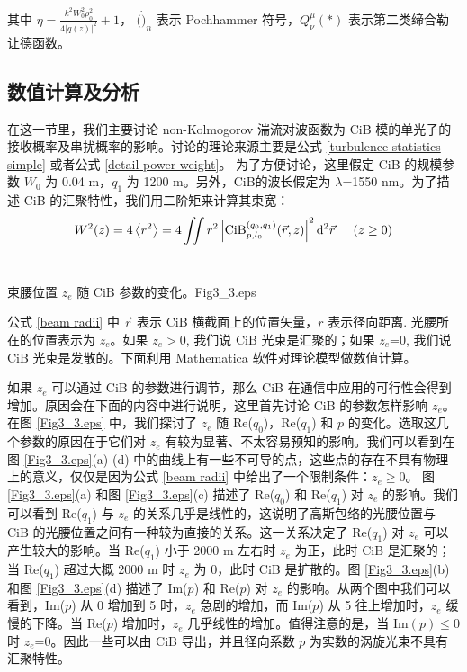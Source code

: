 \documentclass[master]{thesis-uestc}
\begin{document}
\noindent 其中 $\eta=\frac{k^2W_0^2\rho_0^2}{4|q(z)|^2}+1$， $(\dot)_n$ 表示 Pochhammer 符号，$Q_\nu^\mu(\ast)$ 表示第二类缔合勒让德函数。

\subsection{数值计算及分析}

在这一节里，我们主要讨论 non-Kolmogorov 湍流对波函数为 CiB 模的单光子的接收概率及串扰概率的影响。讨论的理论来源主要是公式 \eqref{turbulence statistics simple} 或者公式 \eqref{detail power weight}。 为了方便讨论，这里假定 CiB 的规模参数 $W_0$ 为 0.04 m，$q_1$ 为 1200 m。另外，CiB的波长假定为 $\lambda$=1550 nm。为了描述 CiB 的汇聚特性，我们用二阶矩来计算其束宽：
\begin{equation}\label{beam radii}
  W^2(z)=4\left<r^2\right>=4 \iint r^2\left|\mathrm{CiB}^{(q_0,q_1)}_{p,l_0}(\vec{r},z)\right|^2\mathrm{d}^2\vec{r}\hspace{0.5cm}(z \geq 0)
\end{equation}
\\
\begin{pics}[H]{束腰位置 $z_e$ 随 CiB 参数的变化。}{Fig3_3.eps}
\end{pics}

\noindent 公式 \eqref{beam radii} 中 $\vec{r}$ 表示 CiB 横截面上的位置矢量，$r$ 表示径向距离. 光腰所在的位置表示为 $z_e$。如果 $z_e>0$, 我们说 CiB 光束是汇聚的；如果 $z_e$=0, 我们说 CiB 光束是发散的。下面利用 Mathematica 软件对理论模型做数值计算。

如果 $z_e$ 可以通过 CiB 的参数进行调节，那么 CiB 在通信中应用的可行性会得到增加。原因会在下面的内容中进行说明，这里首先讨论 CiB 的参数怎样影响 $z_e$。 在图 \ref{Fig3_3.eps} 中，我们探讨了 $z_e$ 随 Re($q_0$)，Re($q_1$) 和 $p$ 的变化。选取这几个参数的原因在于它们对 $z_e$ 有较为显著、不太容易预知的影响。我们可以看到在图 \ref{Fig3_3.eps}(a)-(d) 中的曲线上有一些不可导的点，这些点的存在不具有物理上的意义，仅仅是因为公式 \eqref{beam radii} 中给出了一个限制条件：$z_e\geq0$。 图 \ref{Fig3_3.eps}(a) 和图 \ref{Fig3_3.eps}(c) 描述了 Re($q_0$) 和 Re($q_1$) 对 $z_e$ 的影响。我们可以看到 Re($q_1$) 与 $z_e$ 的关系几乎是线性的，这说明了高斯包络的光腰位置与 CiB 的光腰位置之间有一种较为直接的关系。这一关系决定了 Re($q_1$) 对 $z_e$ 可以产生较大的影响。当 Re($q_1$) 小于 2000 m 左右时 $z_e$ 为正，此时 CiB 是汇聚的；当 Re($q_1$) 超过大概 2000 m 时 $z_e$ 为 0，此时 CiB 是扩散的。图 \ref{Fig3_3.eps}(b) 和图 \ref{Fig3_3.eps}(d) 描述了 Im($p$) 和 Re($p$) 对 $z_e$ 的影响。从两个图中我们可以看到，Im($p$) 从 0 增加到 5 时，$z_e$ 急剧的增加，而 Im($p$) 从 5 往上增加时，$z_e$ 缓慢的下降。当 Re($p$) 增加时，$z_e$ 几乎线性的增加。值得注意的是，当 Im$(p)\leq0$ 时 $z_e$=0。因此一些可以由 CiB 导出，并且径向系数 $p$ 为实数的涡旋光束不具有汇聚特性。
\end{document}
